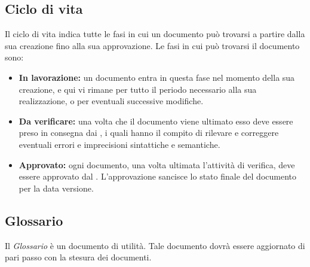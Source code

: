 \subsection{Ciclo di vita}
Il ciclo di vita indica tutte le fasi in cui un documento può trovarsi a partire dalla sua creazione fino alla sua approvazione. Le fasi in cui può trovarsi il documento sono:
\begin{itemize}
	\item \textbf{In lavorazione:} un documento entra in questa fase nel momento della sua creazione, e qui vi rimane per tutto il periodo necessario alla sua realizzazione, o per eventuali successive modifiche. 
	\item \textbf{Da verificare:} una volta che il documento viene ultimato esso deve essere preso in consegna dai \Verificatori{}, i quali hanno il compito di rilevare e correggere eventuali errori e imprecisioni sintattiche e semantiche. 
	\item \textbf{Approvato:} ogni documento, una volta ultimata l'attività di verifica, deve essere approvato dal \Responsabile. L'approvazione sancisce lo stato finale del documento per la data versione.
\end{itemize}

\subsection{Glossario}
Il \textit{Glossario} è un documento di utilità. Tale documento dovrà essere aggiornato di pari passo con la stesura dei documenti.